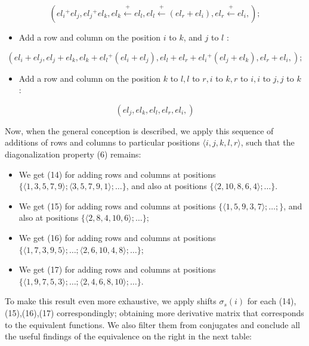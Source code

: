 \documentclass[10pt]{article}
\begin{document}
$$
\left(e l_{i}{ }^{+} e l_{j}, e l_{j}{ }^{+} e l_{k}, e l_{k} \stackrel{+}{\leftarrow} e l_{l}, e l_{l} \stackrel{+}{\leftarrow}\left(e l_{r}+e l_{i}\right), e l_{r} \stackrel{+}{\leftarrow} e l_{i},\right) ;
$$

\begin{itemize}
  \item Add a row and column on the position $i$ to $k$, and $j$ to $l$ :
\end{itemize}

$$
\left(e l_{i}+e l_{j}, e l_{j}+e l_{k}, e l_{k}+e l_{l}{ }^{+}\left(e l_{i}+e l_{j}\right), e l_{l}+e l_{r}+e l_{i}{ }^{+}\left(e l_{j}+e l_{k}\right), e l_{r}+e l_{i},\right) ;
$$

\begin{itemize}
  \item Add a row and column on the position $k$ to $l, l$ to $r, i$ to $k, r$ to $i, i$ to $j, j$ to $k$ :
\end{itemize}

$$
\left(e l_{j}, e l_{k}, e l_{l}, e l_{r}, e l_{i},\right)
$$

Now, when the general conception is described, we apply this sequence of additions of rows and columns to particular positions $\langle i, j, k, l, r\rangle$, such that the diagonalization property (6) remains:

\begin{itemize}
  \item We get (14) for adding rows and columns at positions $\{\langle 1,3,5,7,9\rangle ;\langle 3,5,7,9,1\rangle ; \ldots\}$, and also at positions $\{\langle 2,10,8,6,4\rangle ; \ldots\}$.
  \item We get (15) for adding rows and columns at positions $\{\langle 1,5,9,3,7\rangle ; \ldots ;\}$, and also at positions $\{\langle 2,8,4,10,6\rangle ; \ldots\}$;
  \item We get (16) for adding rows and columns at positions $\{\langle 1,7,3,9,5\rangle ; \ldots ;\langle 2,6,10,4,8\rangle ; \ldots\}$;
  \item We get (17) for adding rows and columns at positions $\{\langle 1,9,7,5,3\rangle ; \ldots ;\langle 2,4,6,8,10\rangle ; \ldots\}$.
\end{itemize}

To make this result even more exhaustive, we apply shifts $\sigma_{s}(i)$ for each (14),(15),(16),(17) correspondingly; obtaining more derivative matrix that corresponds to the equivalent functions. We also filter them from conjugates and conclude all the useful findings of the equivalence on the right in the next table:
\end{document}
